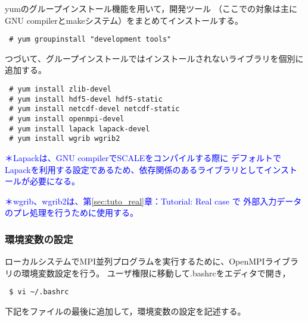 \noindent yumのグループインストール機能を用いて，開発ツール
（ここでの対象は主にGNU compilerとmakeシステム）をまとめてインストールする。
\begin{verbatim}
 # yum groupinstall "development tools"
\end{verbatim}

\noindent つづいて、グループインストールではインストールされないライブラリを個別に追加する。
\begin{verbatim}
 # yum install zlib-devel
 # yum install hdf5-devel hdf5-static
 # yum install netcdf-devel netcdf-static
 # yum install openmpi-devel
 # yum install lapack lapack-devel
 # yum install wgrib wgrib2
\end{verbatim}

\noindent \textcolor{blue}{\small ＊Lapackは、GNU compilerでSCALEをコンパイルする際に
デフォルトでLapackを利用する設定であるため、依存関係のあるライブラリとしてインストールが必要になる。}

\noindent \textcolor{blue}{\small ＊wgrib、wgrib2は、第\ref{sec:tuto_real}章：Tutorial: Real case で
外部入力データのプレ処理を行うために使用する。}



\subsubsection{環境変数の設定}

ローカルシステムでMPI並列プログラムを実行するために、OpenMPIライブラリの環境変数設定を行う。
ユーザ権限に移動して.bashrcをエディタで開き，
\begin{verbatim}
 $ vi ~/.bashrc
\end{verbatim}
下記をファイルの最後に追加して，環境変数の設定を記述する。\\

{\gt
{}}\\

